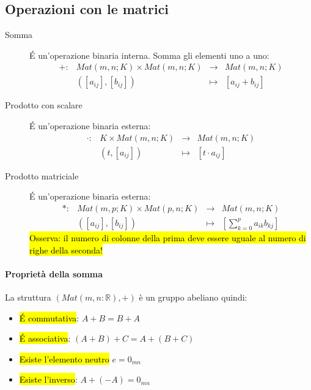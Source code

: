 \subsection{Operazioni con le matrici}
\begin{description}
    \item[Somma] \'E un'operazione binaria interna. Somma gli elementi uno a uno:
        \[
            \begin{array}{cccc}
                +: & Mat(m,n;K) \times Mat(m,n;K) & \to &Mat(m,n;K) \\
                & ([a_{ij}], [b_{ij}]) &\mapsto  & [a_{ij} + b_{ij}]
            \end{array}
        \]
    \item[Prodotto con scalare] \'E un'operazione binaria esterna:
        \[
            \begin{array}{cccc}
                \cdot: & K \times Mat(m,n;K) & \to &Mat(m,n;K) \\
                & (t, [a_{ij}]) &\mapsto  & [t \cdot a_{ij}]
            \end{array}
        \]
    \item[Prodotto matriciale] \'E un'operazione binaria esterna:
        \[
            \begin{array}{cccc}
                \ast: & Mat(m,p;K) \times Mat(p,n;K) & \to &Mat(m,n;K) \\
                & ([a_{ij}], [b_{ij}]) &\mapsto  & [\sum_{k=0}^p a_{ik}b_{kj}]
            \end{array}
        \]
        \hl{Osserva: il numero di colonne della prima deve essere uguale al numero
            di righe della seconda!}
\end{description}

\paragraph{Proprietà della somma} La struttura $(Mat(m,n:\mathbb{R}), +)$ è un
gruppo abeliano quindi:
\begin{itemize}
    \item \hl{\'E commutativa}: $A + B = B + A$
    \item \hl{\'E associativa}: $(A + B) + C = A + (B + C)$
    \item \hl{Esiste l'elemento neutro} $e = 0_{mn}$
    \item \hl{Esiste l'inverso}: $A + (-A) = 0_{mn}$
\end{itemize}

